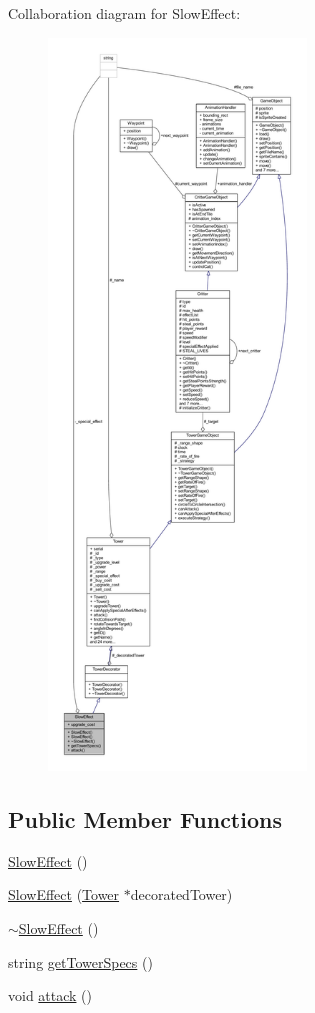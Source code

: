 Collaboration diagram for Slow\+Effect\+:
\nopagebreak
\begin{figure}[H]
\begin{center}
\leavevmode
\includegraphics[height=550pt]{class_slow_effect__coll__graph}
\end{center}
\end{figure}
\subsection*{Public Member Functions}
\begin{DoxyCompactItemize}
\item 
\hyperlink{class_slow_effect_a1a5102880000e6aa3fa0136ebe5a2671}{Slow\+Effect} ()
\item 
\hyperlink{class_slow_effect_a451bf06f86366b8857e09bcb38834756}{Slow\+Effect} (\hyperlink{class_tower}{Tower} $\ast$decorated\+Tower)
\item 
\hyperlink{class_slow_effect_ad3b634de8961abf63e121d603ab33f81}{$\sim$\+Slow\+Effect} ()
\item 
string \hyperlink{class_slow_effect_aaa162ffbad9bc163a53b0927b035dcb8}{get\+Tower\+Specs} ()
\item 
void \hyperlink{class_slow_effect_a0004dd210f4c8aac78fc72902b2bba1f}{attack} ()
\end{DoxyCompactItemize}
